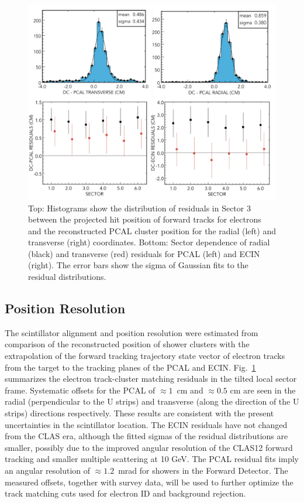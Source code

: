 \begin{figure}[t]
\centering
\includegraphics[width=1.0\columnwidth,keepaspectratio]{img/S10_1_3.png}
\caption[]{Top: Histograms show the distribution of residuals in Sector 3 between the projected hit position of forward tracks for electrons and the reconstructed PCAL cluster position for the radial (left) and transverse (right) coordinates. Bottom: Sector dependence of radial (black) and transverse (red) residuals for PCAL (left) and ECIN (right).  The error bars show the sigma of Gaussian fits to the residual distributions.}
\label{fig:S10_1_3}
\end{figure}

\subsection{Position Resolution}
The scintillator alignment and position resolution were estimated from comparison of the reconstructed position of shower clusters with the extrapolation of the forward tracking trajectory state vector of electron tracks from the target to the tracking planes of the PCAL and ECIN.  
Fig.~\ref{fig:S10_1_3} summarizes the electron track-cluster matching residuals in the tilted local sector frame.   Systematic offsets for the PCAL of $\approx 1$~cm and $\approx 0.5$ cm are seen in the radial (perpendicular to the U strips) and transverse (along the direction of the U strips) directions respectively.  These results are consistent with the present uncertainties in the scintillator location. The ECIN residuals have not changed from the CLAS era, although the fitted sigmas of the residual distributions are smaller, possibly due to the improved angular resolution of the CLAS12 forward tracking and smaller multiple scattering at 10 GeV.  The PCAL residual fits imply an angular resolution of $\approx 1.2$~mrad for showers in the Forward Detector.  The measured offsets, together with survey data, will be used to further optimize the track matching cuts used for electron ID and background rejection. 

